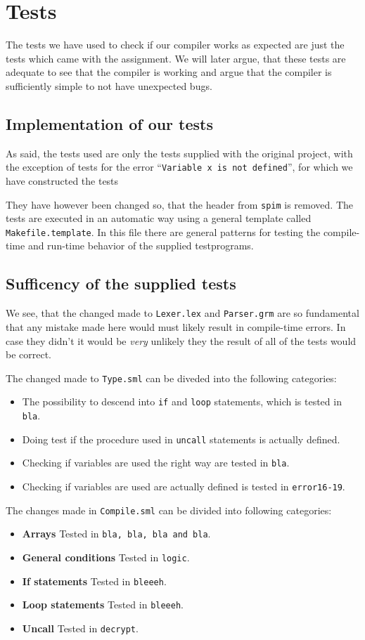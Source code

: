 \section{Tests}

The tests we have used to check if our compiler works as expected are
just the tests which came with the assignment. We will later argue, that
these tests are adequate to see that the compiler is working and argue that
the compiler is sufficiently simple to not have unexpected bugs.

\subsection{Implementation of our tests}
As said, the tests used are only the tests supplied with the original project,
with the exception of tests for the error ``{\tt Variable x is not defined}'',
for which we have constructed the tests 

They have however been changed so, that the header from {\tt spim} is removed.
The tests are executed in an automatic way using a general template called
{\tt Makefile.template}. In this file there are general patterns for testing
the compile-time and run-time behavior of the supplied testprograms.

\subsection{Sufficency of the supplied tests}
We see, that the changed made to {\tt Lexer.lex} and {\tt Parser.grm} are
so fundamental that any mistake made here would must likely result in
compile-time errors. In case they didn't it would be \emph{very} unlikely
they the result of all of the tests would be correct.

The changed made to {\tt Type.sml} can be diveded into the following categories:
\begin{itemize}
\item The possibility to descend into {\tt if} and {\tt loop} statements, which is tested in {\tt bla}.
\item Doing test if the procedure used in {\tt uncall} statements is actually defined.
\item Checking if variables are used the right way are tested in {\tt bla}.
\item Checking if variables are used are actually defined is tested in {\tt error16-19}.
\end{itemize}

\vspace{0.2cm}
The changes made in {\tt Compile.sml} can be divided into following categories:
\begin{itemize}
\item {\bf Arrays} Tested in {\tt bla, bla, bla and bla}.
\item {\bf General conditions} Tested in {\tt logic}.
\item {\bf If statements} Tested in {\tt bleeeh}.
\item {\bf Loop statements} Tested in {\tt bleeeh}.
\item {\bf Uncall} Tested in {\tt decrypt}.
\end{itemize}

